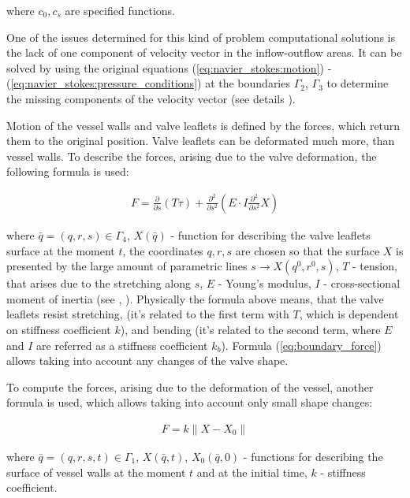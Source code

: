 \documentclass[runningheads,a4paper]{llncs}
\begin{document}
where $c_0, c_s$ are specified functions.

One of the issues determined for this kind of problem computational solutions is the lack of one component of velocity vector in the inflow-outflow areas.
It can be solved by using the original equations (\ref{eq:navier_stokes:motion}) - (\ref{eq:navier_stokes:pressure_conditions}) at the boundaries
$\Gamma_2$, $\Gamma_3$ to determine the missing components of the velocity vector (see details \cite{gummel}).

Motion of the vessel walls and valve leaflets is defined by the forces, which return them to the original position. Valve leaflets can be deformated much more,
than vessel walls. To describe the forces, arising due to the valve deformation, the following formula is used:

\begin{gather}
    \label{eq:boundary_force}
    F = \frac{\partial}{\partial s} (T \tau) + \frac{\partial^2}{\partial s^2} (E \cdot I \frac{\partial^2}{\partial s^2} X)
\end{gather}

where $\bar{q} = (q, r, s) \in \Gamma_4$, $X(\bar{q})$ - function for describing the valve leaflets surface at the moment $t$, the coordinates $q, r, s$ are chosen 
so that the surface $X$ is presented by the large amount of parametric lines $s \rightarrow X(q^0, r^0, s)$, $T$ - tension,
that arises due to the stretching along $s$, $E$ - Young's modulus, $I$ - cross-sectional moment of inertia (see \cite{boyce_2011}, \cite{pescin_2002}).
Physically the formula above means, that the valve leaflets resist stretching, (it's related to the first term with $T$,
which is dependent on stiffness coefficient $k$), and bending (it's related to the second term, where $E$ and $I$ are referred as a stiffness coefficient $k_b$).
Formula (\ref{eq:boundary_force}) allows taking into account any changes of the valve shape.

To compute the forces, arising due to the deformation of the vessel, another formula is used, which allows taking into account only small shape changes:

\begin{gather}
    \label{eq:boundary_force_simple}
    F = k \|X - X_0\|
\end{gather}

where $\bar{q} = (q, r, s, t) \in \Gamma_1$, $X(\bar{q}, t)$, $X_0(\bar{q}, 0)$ - functions for describing the surface of vessel walls at the moment $t$ and at the initial time, $k$ - stiffness coefficient.
\end{document}
